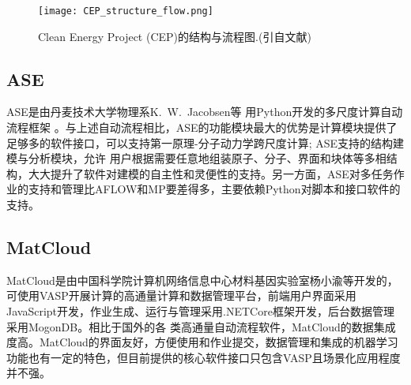 \begin{figure}[h!]
\centering
\texttt{[image: CEP\_structure\_flow.png]}%
\caption{\textrm{Clean Energy Project (CEP)}的结构与流程图.(引自文献)}
\label{Auto_Flow_Platform-4}
\end{figure}

\subsection{\rm{ASE}}
\textrm{ASE}是由丹麦技术大学物理系\textrm{K.~W.~Jacobsen}等 用\textrm{Python}开发的多尺度计算自动流程框架 。与上述自动流程相比，\textrm{ASE}的功能模块最大的优势是计算模块提供了足够多的软件接口，可以支持第一原理-分子动力学跨尺度计算; \textrm{ASE}支持的结构建模与分析模块，允许 用户根据需要任意地组装原子、分子、界面和块体等多相结构，大大提升了软件对建模的自主性和灵便性的支持。另一方面，\textrm{ASE}对多任务作业的支持和管理比\textrm{AFLOW}和\textrm{MP}要差得多，主要依赖\textrm{Python}对脚本和接口软件的支持。

\subsection{\rm{MatCloud}}
\textrm{MatCloud}是由中国科学院计算机网络信息中心材料基因实验室杨小渝等开发的，可使用\textrm{VASP}开展计算的高通量计算和数据管理平台\cite{CMS146-319_2018}，前端用户界面采用\textrm{JavaScript}开发，作业生成、运行与管理采用\textrm{.NETCore}框架开发，后台数据管理采用\textrm{MogonDB}。相比于国外的各 类高通量自动流程软件，\textrm{MatCloud}的数据集成度高。\textrm{MatCloud}的界面友好，方便使用和作业提交，数据管理和集成的机器学习功能也有一定的特色，但目前提供的核心软件接口只包含\textrm{VASP}且场景化应用程度并不强。

